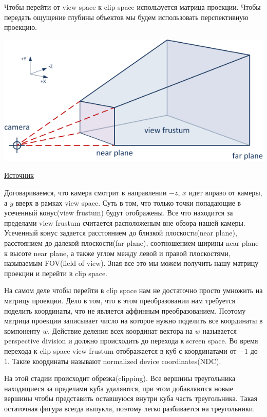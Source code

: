 \documentclass{article}
\begin{document}
Чтобы перейти от view space к clip space используется 
матрица проекции. Чтобы передать ощущение глубины объектов мы 
будем использовать перспективную проекцию. 

\begin{center}
    \includegraphics[scale=5]{frustum.png}

    \href{https://learnopengl.com/Guest-Articles/2021/Scene/Frustum-Culling}{Источник}
\end{center}

Договариваемся, что камера смотрит в направлении $-z$, 
$x$ идет вправо от камеры, а $y$ вверх в рамках 
view space.
Суть в том, что только точки попадающие в 
усеченный конус(view frustum) будут отображены. 
Все что находится за пределами view frustum считается
расположеным вне обзора нашей камеры. Усеченный 
конус задается расстоянием до близкой плоскости(near plane), 
расстоянием до далекой плоскости(far plane), соотношением 
ширины near plane к высоте near plane, а также углом 
между левой и правой плоскостями, называемым FOV(field of view).
Зная все это мы можем получить нашу матрицу проекции и перейти в clip 
space.

На самом деле чтобы перейти в clip space нам не достаточно 
просто умножить на матрицу проекции. Дело в том, что 
в этом преобразовании нам требуется поделить координаты, что 
не является аффинным преобразованием. Поэтому матрица проекции 
записывает число на которое нужно поделить все координаты в компоненту 
$w$. Действие деления всех координат вектора на $w$ называется 
perspective division и должно происходить до перехода 
к screen space. Во время перехода к clip space view 
frustum отображается в куб с координатами от $-1$ до $1$. 
Такие координаты называют normalized device coordinates(NDC).

На этой стадии происходит обрезка(clipping). Все вершины 
треугольника находящиеся за пределами куба удаляются, 
при этом добавляются новые вершины чтобы представить 
оставшуюся внутри куба часть треугольника. Такая остаточная 
фигура всегда выпукла, поэтому легко разбивается на треугольники.
\end{document}
